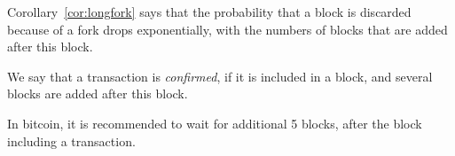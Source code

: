 Corollary~\ref{cor:longfork} says that the probability that a block is discarded because of a fork drops exponentially, with the numbers of blocks that are added after this block.

\begin{definition} We say that a transaction is \emph{confirmed}, if it is included in a block, and several blocks are added after this block.
	
In bitcoin, it is recommended to wait for additional 5 blocks, after the block including a transaction.	
\end{definition}

	